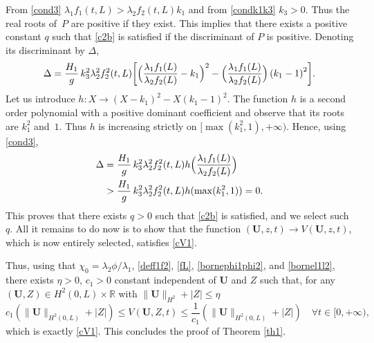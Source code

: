 \documentclass[11pt]{article}
\numberwithin{equation}{section}
\theoremstyle{definition}
\begin{document}
From \eqref{cond3} $\lambda_{1}f_{1}(t,L)>\lambda_{2}f_{2}(t,L)k_{1}$ and from \eqref{condk1k3} $k_{3}>0$. Thus the real roots of~$P$ are positive if they exist. This implies that there exists a positive constant $q$ such that \eqref{c2b} is satisfied if the discriminant of $P$
is positive. Denoting its discriminant by $\Delta$,
\begin{equation*}
\Delta=\frac{H_{1}}{g}\,k_{3}^{2}\lambda_{2}^{2}f_{2}^{2}(t,L)\biggl[\Bigl(\frac{\lambda_{1}f_{1}(L)}{\lambda_{2}f_{2}(L)}-k_{1} \Bigr)^{2}-\Bigl(\frac{\lambda_{1}f_{1}(L)}{\lambda_{2}f_{2}(L)} \Bigr)\left(k_{1}-1\right)^{2}\biggr].
\end{equation*}
Let us introduce $h:X\to (X-k_{1})^{2}-X(k_{1}-1)^{2}$. The function $h$ is a second order polynomial with a positive dominant coefficient and observe that its roots are
$k_{1}^{2}$ and~$1$. Thus
$h$ is increasing strictly on $[\max(k_{1}^{2},1),+\infty)$.
Hence, using \eqref{cond3},
\begin{equation*}
\begin{split}
\Delta&=\frac{H_{1}}{g}\,k_{3}^{2}\lambda_{2}^{2}f_{2}^{2}(t,L)h \Bigl(\frac{\lambda_{1}f_{1}(L)}{\lambda_{2}f_{2}(L)} \Bigr)\\
&>\frac{H_{1}}{g}\,k_{3}^{2}\lambda_{2}^{2}f_{2}^{2}(t,L)h(\max(k_{1}^{2},1))
=0.
\end{split}
\end{equation*}
This proves that there exists $q>0$ such that \eqref{c2b} is satisfied, and we select such $q$.
All it remains to do now is to show that the function $(\boldsymbol{U},z,{t})\to V(\boldsymbol{U},z,{t})$, which is now entirely selected, satisfies \eqref{cV1}.

Thus, using that $\chi_{0}=\lambda_{2}\phi/\lambda_{1}$, \eqref{deff1f2}, \eqref{fL}, \eqref{bornephi1phi2}, and \eqref{bornel1l2}, there exists $\eta>0$, $c_{1}>0$ constant independent of $\boldsymbol{U}$ and ${Z}$ such that, for any $(\boldsymbol{U},{Z})\in H^{2}(0,L)\times \mathbb{R}$ {with $\|\boldsymbol{U}\|_{H^{2}}+|Z|\leq \eta$}
\begin{equation*}
c_{1}\left(\lVert \boldsymbol{U}\rVert_{H^{2}(0,L)}+|Z|\right) \leq V(\boldsymbol{U},Z,{t})\leq \frac{1}{c_{1}}\left(\lVert \boldsymbol{U}\rVert_{H^{2}(0,L)}+|Z|\right)\quad\forall t\in[0,+\infty),
\end{equation*}
which is exactly \eqref{cV1}. This concludes the proof of Theorem \ref{th1}.
\end{document}
